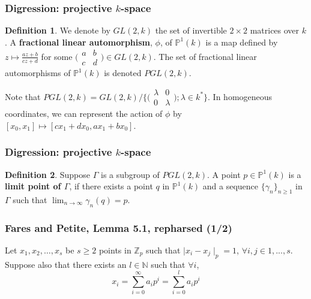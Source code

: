 \documentclass{beamer}
\theoremstyle{definition}
\newtheorem*{definition*}{Definition}
\begin{document}
\begin{frame}
\frametitle{Digression: projective $k$-space}
\begin{definition*}
	We denote by $GL(2,k)$ the set of invertible $2 \times 2$ matrices over $k$. A \textbf{fractional linear automorphism}, $\phi$, of $\mathbb{P}^1(k)$ is a map  defined by $z \mapsto \frac{az +b}{cz +d}$ for some 
	$\bigl( \begin{smallmatrix}a & b\\ c &d\end{smallmatrix}\bigr) \in GL(2,k)$. The set of fractional linear automorphisms of $\mathbb{P}^1(k)$ is denoted $PGL(2,k)$.
\parskip=20pt

 Note that $PGL(2,k) = GL(2,k) / \{ \bigl( \begin{smallmatrix}\lambda & 0\\ 0 &\lambda \end{smallmatrix}\bigr); \lambda \in k^*  \}$. In homogeneous coordinates, we can represent the action of $\phi$ by $[x_0,x_1] \mapsto [cx_1 +dx_0, ax_1 +bx_0]$. 
\end{definition*}
\end{frame}

\begin{frame}
\frametitle{Digression: projective $k$-space}
\begin{definition*}
	Suppose $\Gamma$ is a subgroup of $PGL(2,k)$. A point $p  \in \mathbb{P}^1(k)$ is a \textbf{limit point of $\Gamma$}, if there exists a point $q$ in  $\mathbb{P}^1(k)$ and a sequence $\{\gamma_n\}_{n\geq 1}$ in $\Gamma$ such that $\lim_{n\to\infty} \gamma_n(q) = p$.
\end{definition*}

\end{frame}

\begin{frame}
\frametitle{Fares and Petite, Lemma 5.1, repharsed (1/2)}
 Let $x_1,x_2,\ldots,x_s$ be $s \geq 2$ points in $\mathbb{Z}_p$ such that $\mid x_i - x_j \mid_p = 1$, $\forall i,j \in 1,...,s$. Suppose also that there exists an $l \in \mathbb{N}$ such that  $\forall i$, $$x_i = \sum_{i=0}^{\infty} a_ip^i = \sum_{i=0}^{l} a_ip^i $$
\end{frame}
\end{document}
